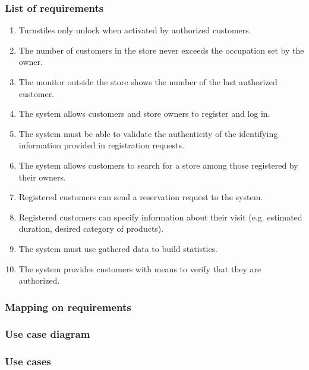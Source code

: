\subsubsection{List of requirements}
\begin{enumerate}[label=R\arabic*]
	\item Turnstiles only unlock when activated by authorized customers.
	\item The number of customers in the store never exceeds the occupation set by the owner.
	\item The monitor outside the store shows the number of the last authorized customer.
	\item The system allows customers and store owners to register and log in.
	\item The system must be able to validate the authenticity of the identifying information provided in registration requests.
	\item The system allows customers to search for a store among those registered by their owners.
	\item Registered customers can send a reservation request to the system.
	\item Registered customers can specify information about their visit (e.g. estimated duration, desired category of products).
	\item The system must use gathered data to build statistics. %
	\item The system provides customers with means to verify that they are authorized.
\end{enumerate}
\subsubsection{Mapping on requirements}
\subsubsection{Use case diagram}
\subsubsection{Use cases}
